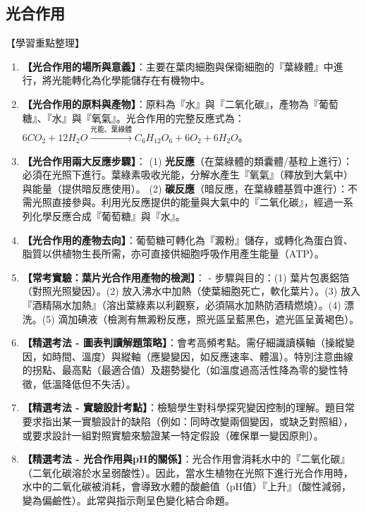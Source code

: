 \documentclass[11pt,a4paper]{article}
\begin{document}
\subsection{光合作用}
\begin{learningpoints}{【學習重點整理】}
\begin{enumerate}[label=\arabic*.]
  \item \textbf{【光合作用的場所與意義】}：主要在葉肉細胞與保衛細胞的『葉綠體』中進行，將光能轉化為化學能儲存在有機物中。
  \item \textbf{【光合作用的原料與產物】}：原料為『水』與『二氧化碳』，產物為『葡萄糖』、『水』與『氧氣』。光合作用的完整反應式為：$6CO_2 + 12H_2O \xrightarrow{\text{光能、葉綠體}} C_6H_{12}O_6 + 6O_2 + 6H_2O$。
  \item \textbf{【光合作用兩大反應步驟】}：
  (1) \textbf{光反應}（在葉綠體的類囊體/基粒上進行）：必須在光照下進行。葉綠素吸收光能，分解水產生『氧氣』（釋放到大氣中）與能量（提供暗反應使用）。
  (2) \textbf{碳反應}（暗反應，在葉綠體基質中進行）：不需光照直接參與。利用光反應提供的能量與大氣中的『二氧化碳』，經過一系列化學反應合成『葡萄糖』與『水』。
  \item \textbf{【光合作用的產物去向】}：葡萄糖可轉化為『澱粉』儲存，或轉化為蛋白質、脂質以供植物生長所需，亦可直接供細胞呼吸作用產生能量（ATP）。
  \item \textbf{【常考實驗：葉片光合作用產物的檢測】}：
  - 步驟與目的：(1) 葉片包裹鋁箔（對照光照變因）。(2) 放入沸水中加熱（使葉細胞死亡，軟化葉片）。(3) 放入『酒精隔水加熱』（溶出葉綠素以利觀察，必須隔水加熱防酒精燃燒）。(4) 漂洗。(5) 滴加碘液（檢測有無澱粉反應，照光區呈藍黑色，遮光區呈黃褐色）。
  \item \textbf{【精選考法 - 圖表判讀解題策略】}：會考高頻考點。需仔細識讀橫軸（操縱變因，如時間、溫度）與縱軸（應變變因，如反應速率、體溫）。特別注意曲線的拐點、最高點（最適合值）及趨勢變化（如溫度過高活性降為零的變性特徵，低溫降低但不失活）。
  \item \textbf{【精選考法 - 實驗設計考點】}：檢驗學生對科學探究變因控制的理解。題目常要求指出某一實驗設計的缺陷（例如：同時改變兩個變因，或缺乏對照組），或要求設計一組對照實驗來驗證某一特定假設（確保單一變因原則）。
  \item \textbf{【精選考法 - 光合作用與pH的關係】}：光合作用會消耗水中的『二氧化碳』（二氧化碳溶於水呈弱酸性）。因此，當水生植物在光照下進行光合作用時，水中的二氧化碳被消耗，會導致水體的酸鹼值（pH值）『上升』（酸性減弱，變為偏鹼性）。此常與指示劑呈色變化結合命題。
\end{enumerate}
\end{learningpoints}
\end{document}
